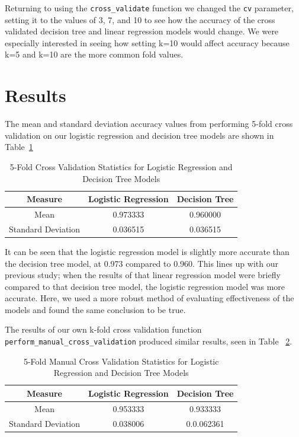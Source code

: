 \documentclass[journal]{IEEEtran}
\begin{document}
Returning to using the \lstinline{cross_validate} function we changed the \lstinline{cv} parameter, setting it to the values of 3, 7, and 10 to see how the accuracy of the cross validated decision tree and linear regression models would change. We were especially interested in seeing how setting k=10 would affect accuracy because k=5 and k=10 are the more common fold values.


\section{Results}
\label{sec:results}

The mean and standard deviation accuracy values from performing 5-fold cross validation on our logistic regression and decision tree models are shown in Table~\ref{table:5FoldCV}

\begin{table}[h!]
\centering
\begin{tabular}{ c | c c }
Measure & Logistic Regression & Decision Tree \\
\hline
Mean & 0.973333 & 0.960000 \\
Standard Deviation & 0.036515 & 0.036515 \\
\end{tabular}
\caption{5-Fold Cross Validation Statistics for Logistic Regression and Decision Tree Models}
\label{table:5FoldCV}
\end{table}

It can be seen that the logistic regression model is slightly more accurate than the decision tree model, at 0.973 compared to 0.960. This lines up with our previous study; when the results of that linear regression model were briefly compared to that decision tree model, the logistic regression model was more accurate. Here, we used a more robust method of evaluating effectiveness of the models and found the same conclusion to be true.

The results of our own k-fold cross validation function \lstinline{perform_manual_cross_validation} produced similar results, seen in Table ~\ref{table:5FoldManualCV}. 

\begin{table}[h!]
\centering
\begin{tabular}{ c | c c }
Measure & Logistic Regression & Decision Tree \\
\hline
Mean & 0.953333 & 0.933333 \\
Standard Deviation & 0.038006 & 0.0.062361 \\
\end{tabular}
\caption{5-Fold Manual Cross Validation Statistics for Logistic Regression and Decision Tree Models}
\label{table:5FoldManualCV}
\end{table}
\end{document}
